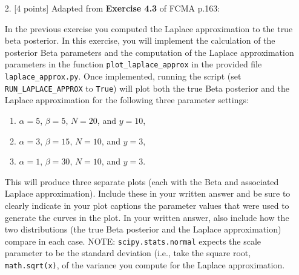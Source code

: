 \documentclass[10pt]{article}
\begin{document}
\begin{itemize}
\item[2.]  [4 points]
Adapted from {\bf Exercise 4.3} of FCMA p.163:

In the previous exercise you computed the Laplace approximation to the true beta posterior.  In this exercise, you will implement the calculation of the posterior Beta parameters and the computation of the Laplace approximation parameters in the function {\tt plot\_laplace\_approx} in the provided file {\tt laplace\_approx.py}. Once implemented, running the script (set {\tt RUN\_LAPLACE\_APPROX} to {\tt True}) will plot both the true Beta posterior and the Laplace approximation for the following three parameter settings:
\begin{enumerate}
\item $\alpha = 5$, $\beta = 5$, $N = 20$, and $y = 10$,
\item $\alpha = 3$, $\beta = 15$, $N = 10$, and $y = 3$,
\item $\alpha = 1$, $\beta = 30$, $N = 10$, and $y = 3$.
\end{enumerate}
This will produce three separate plots (each with the Beta and associated Laplace approximation). Include these in your written answer and be sure to clearly indicate in your plot captions the parameter values that were used to generate the curves in the plot. In your written answer, also include how the two distributions (the true Beta posterior and the Laplace approximation) compare in each case. NOTE: {\tt scipy.stats.normal} expects the scale parameter to be the standard deviation (i.e., take the square root, {\tt math.sqrt(x)}, of the variance you compute for the Laplace approximation.


\end{itemize}
\end{document}

